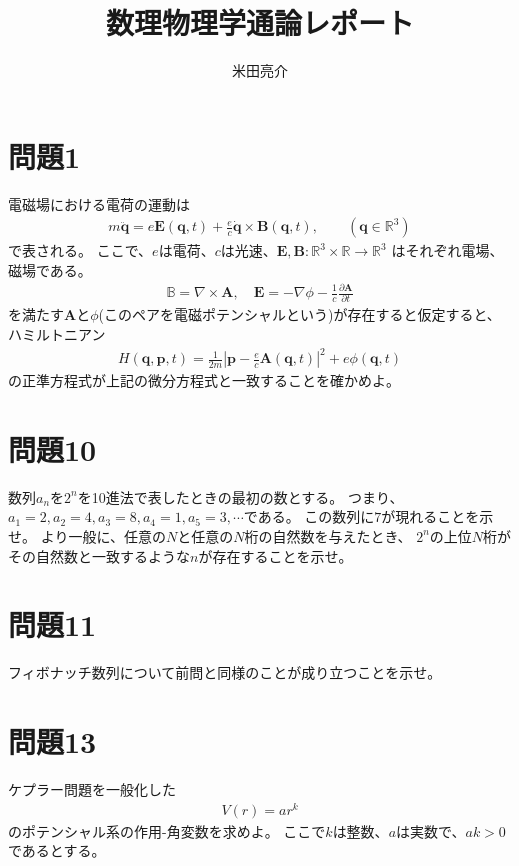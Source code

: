 \documentclass{jsarticle}
\begin{document}
\title{数理物理学通論レポート}
\author{米田亮介}
\date{}
\maketitle
\section*{問題1}
\begin{shaded}
電磁場における電荷の運動は
\begin{align}
m\ddot{\pmb{q}}=e\pmb{E}(\pmb{q},t)+\frac{e}{c}\dot{\pmb{q}}\times\pmb{B}(\pmb{q},t),\qquad(\pmb{q}\in \mathbb{R}^{3})
\end{align}
で表される。
ここで、$e$は電荷、$c$は光速、$\pmb{E},\pmb{B}:\mathbb{R}^{3}\times\mathbb{R}\to\mathbb{R}^{3}$
はそれぞれ電場、磁場である。
\begin{align}
\mathbb{B}=\nabla\times\pmb{A},\quad
\pmb{E}=-\nabla\phi-\frac{1}{c}\frac{\partial\pmb{A}}{\partial t}
\end{align}
を満たす$\pmb{A}$と$\phi$(このペアを電磁ポテンシャルという)が存在すると仮定すると、ハミルトニアン
\begin{align}
H(\pmb{q},\pmb{p},t)=\frac{1}{2m}\left|\pmb{p}-\frac{e}{c}\pmb{A}(\pmb{q},t)\right|^{2}+e\phi(\pmb{q},t)
\end{align}
の正準方程式が上記の微分方程式と一致することを確かめよ。
\end{shaded}
\section*{問題10}
\begin{shaded}
数列$a_{n}$を$2^{n}$を10進法で表したときの最初の数とする。
つまり、$a_{1}=2,a_{2}=4,a_{3}=8,a_{4}=1,a_{5}=3,\cdots$である。
この数列に$7$が現れることを示せ。
より一般に、任意の$N$と任意の$N$桁の自然数を与えたとき、
$2^{n}$の上位$N$桁がその自然数と一致するような$n$が存在することを示せ。
\end{shaded}
\section*{問題11}
\begin{shaded}
フィボナッチ数列について前問と同様のことが成り立つことを示せ。
\end{shaded}
\section*{問題13}
\begin{shaded}
ケプラー問題を一般化した
\begin{align}
V(r)=ar^{k}
\end{align}
のポテンシャル系の作用-角変数を求めよ。
ここで$k$は整数、$a$は実数で、$ak>0$であるとする。
\end{shaded}
\end{document}
